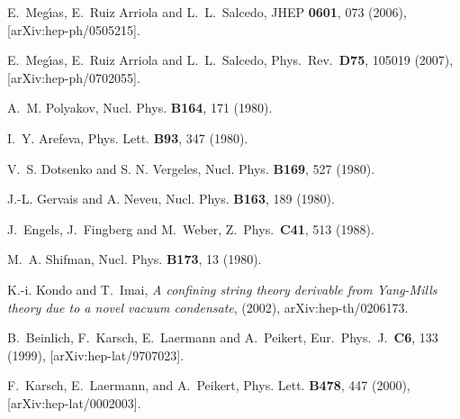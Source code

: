 \begin{thebibliography}{10}

  E.~Meg\'{\i}as, E.~Ruiz Arriola and L.~L.~Salcedo,
  JHEP {\bf 0601}, 073 (2006),
  [arXiv:hep-ph/0505215].


  E.~Meg\'{\i}as, E.~Ruiz Arriola and L.~L.~Salcedo,
  Phys.\ Rev.\  {\bf D75}, 105019 (2007),
  [arXiv:hep-ph/0702055].



A.~M. Polyakov,
\newblock Nucl. Phys. {\bf B164}, 171 (1980).

I.~Y. Arefeva,
\newblock Phys. Lett. {\bf B93}, 347 (1980).

V.~S. Dotsenko and S. N. Vergeles,
\newblock Nucl. Phys. {\bf B169}, 527 (1980).

J.-L. Gervais and A. Neveu,
\newblock Nucl. Phys. {\bf B163}, 189 (1980).


  J.~Engels, J.~Fingberg and M.~Weber,
  Z.\ Phys.\ {\bf C41}, 513 (1988).

M.~A. Shifman,
\newblock Nucl. Phys. {\bf B173}, 13 (1980).

K.-i. Kondo and T.~Imai, {\it A confining string theory derivable from
  Yang-Mills theory due to a  novel vacuum condensate},
\newblock (2002), arXiv:hep-th/0206173.

  B.~Beinlich, F.~Karsch, E.~Laermann and A.~Peikert,
  Eur.\ Phys.\ J.\  {\bf C6}, 133 (1999),
  [arXiv:hep-lat/9707023].


F.~Karsch, E.~Laermann, and A.~Peikert,
\newblock Phys. Lett. {\bf B478}, 447 (2000), [arXiv:hep-lat/0002003].


\end{thebibliography}
